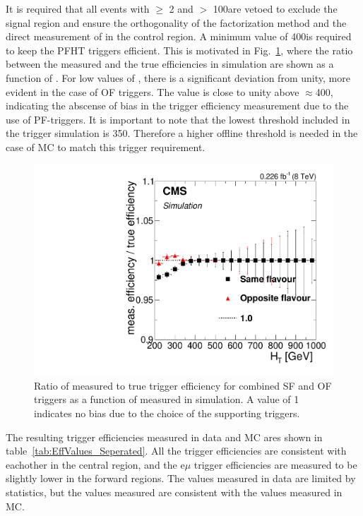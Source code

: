 It is required that all events with \nj $\geq$ 2 and \MET $>$ 100\GeV are vetoed to exclude the signal region
and ensure the orthogonality of the factorization method and the direct measurement of \rsfof in the control region.
A minimum \HT value of 400\GeV is required to keep the PFHT triggers efficient.
This is motivated in Fig.~\ref{fig:triggerBias},
where the ratio between the measured and the true efficiencies in \ttbar simulation are shown as a function of \HT.
For low values of \HT, there is a significant deviation from unity,
more evident in the case of OF triggers.
The value is close to unity above $\approx$400\GeV,
indicating the abscense of bias in the trigger efficiency measurement due to the use of PF-\HT triggers.
It is important to note that the lowest \HT threshold included in the trigger simulation is 350\GeV.
Therefore a higher offline \HT threshold is needed in the case of MC to match this trigger requirement. 

\begin{figure}[htb]
  \begin{center}
    \includegraphics[scale=0.35]{bkgd/figs/Triggereff_AlphaTSyst_PFHT_HighHTExclusive_Run2015_25ns_HT_None.pdf}
    \caption{
      Ratio of measured to true trigger efficiency for combined SF and OF triggers as a function of \HT measured in \ttbar simulation.
      A value of 1 indicates no bias due to the choice of the supporting triggers.
    }
    \label{fig:triggerBias}
  \end{center}
\end{figure}

The resulting trigger efficiencies measured in data and MC ares shown in table~\ref{tab:EffValues_Seperated}.
All the trigger efficiencies are consistent with eachother in the central region,
and the e$\mu$ trigger efficiencies are measured to be slightly lower in the forward regions.
The values measured in data are limited by statistics, but the values measured are consistent with the values measured in MC.

